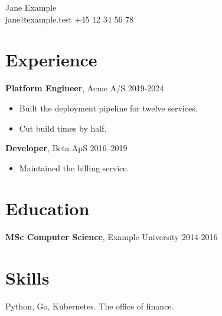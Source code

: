 \documentclass[a4paper,11pt]{article}
\begin{document}
{\LARGE Jane Example}\\
jane@example.test \quad +45 12 34 56 78
\section*{Experience}
\textbf{Platform Engineer}, Acme A/S \hfill 2019-2024\\
\begin{itemize}
\item Built the deployment pipeline for twelve services.
\item Cut build times by half.
\end{itemize}
\textbf{Developer}, Beta ApS \hfill 2016--2019
\begin{itemize}
\item Maintained the billing service.
\end{itemize}
\vspace{30\baselineskip}
\section*{Education}
\textbf{MSc Computer Science}, Example University \hfill 2014-2016
\newpage
\section*{Skills}
Python, Go, Kubernetes. The office of fi\-nance.
\end{document}
